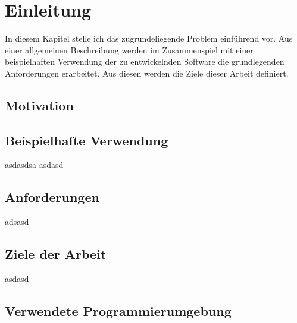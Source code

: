 \chapter{Einleitung}\label{chap:Einleitung}
\chapterstart
In diesem Kapitel stelle ich das zugrundeliegende Problem einführend vor. Aus einer allgemeinen Beschreibung werden im Zusammenspiel mit einer beispielhaften Verwendung der zu entwickelnden Software die grundlegenden Anforderungen erarbeitet. Aus diesen werden die Ziele dieser Arbeit definiert.
\section{Motivation}

\section{Beispielhafte Verwendung}
asdasdsa
asdasd
\section{Anforderungen}
adsasd
\section{Ziele der Arbeit}
asdasd
\section{Verwendete Programmierumgebung}
\chapterend
